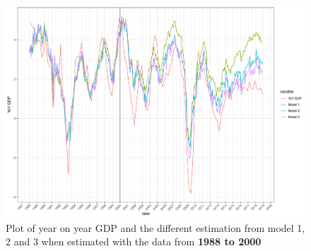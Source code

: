 \documentclass[12pt,a4paper,oneside]{book}
\begin{document}
\begin{figure}[H]
    \centering
    \includegraphics[scale=0.5]{Graphs/predictions2.pdf}
    \caption{Plot of year on year GDP and the different estimation from model 1, 2 and 3 when estimated with the data from \textbf{1988 to 2000}}
    \label{fig:predictions1}
\end{figure}
\end{document}
